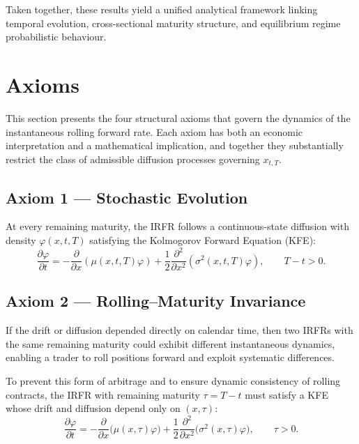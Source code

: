 \documentclass[12pt]{article}
\theoremstyle{statementstyle}
\begin{document}
Taken together, these results yield a unified analytical framework
linking temporal evolution, cross-sectional maturity structure, and
equilibrium regime probabilistic behaviour.

\section{Axioms}
\label{sec:axioms}

This section presents the four structural axioms that govern the
dynamics of the instantaneous rolling forward rate. Each axiom has
both an economic interpretation and a mathematical implication, and
together they substantially restrict the class of admissible diffusion
processes governing $x_{t,T}$.

\subsection*{Axiom 1 --- Stochastic Evolution}
\label{ax:stochastic}

At every remaining maturity, the IRFR follows a continuous-state 
diffusion with density $\varphi(x,t,T)$ satisfying the Kolmogorov 
Forward Equation (KFE):
\begin{equation}
\frac{\partial \varphi}{\partial t}
=
-\frac{\partial}{\partial x}(\mu(x,t,T)\varphi)
+ \frac12 \frac{\partial^{2}}{\partial x^{2}}
\!\left(\sigma^{2}(x,t,T)\varphi\right),
\qquad T - t > 0.
\tag{2.0.1}\label{eq:axiom1}
\end{equation}

\subsection*{Axiom 2 --- Rolling--Maturity Invariance}
\label{ax:rolling}

If the drift or diffusion depended directly on calendar time, then two 
IRFRs with the same remaining maturity could exhibit different 
instantaneous dynamics, enabling a trader to roll positions forward and 
exploit systematic differences.

To prevent this form of arbitrage and to ensure dynamic consistency of 
rolling contracts, the IRFR with remaining maturity $\tau = T - t$ must 
satisfy a KFE whose drift and diffusion depend only on $(x,\tau)$:
\begin{equation}
\frac{\partial \varphi}{\partial t}
=
-\frac{\partial}{\partial x}\bigl(\mu(x,\tau)\varphi\bigr)
+ \frac12 \frac{\partial^{2}}{\partial x^{2}}
\bigl(\sigma^{2}(x,\tau)\varphi\bigr),
\qquad \tau > 0.
\tag{2.0.2}\label{eq:axiom2}
\end{equation}
\end{document}
